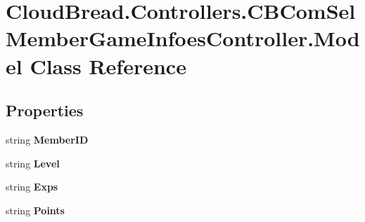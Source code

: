 \hypertarget{class_cloud_bread_1_1_controllers_1_1_c_b_com_sel_member_game_infoes_controller_1_1_model}{}\section{Cloud\+Bread.\+Controllers.\+C\+B\+Com\+Sel\+Member\+Game\+Infoes\+Controller.\+Model Class Reference}
\label{class_cloud_bread_1_1_controllers_1_1_c_b_com_sel_member_game_infoes_controller_1_1_model}
\subsection*{Properties}
\begin{DoxyCompactItemize}
\item 
string {\bfseries Member\+ID}\hypertarget{class_cloud_bread_1_1_controllers_1_1_c_b_com_sel_member_game_infoes_controller_1_1_model_a66c63361d1da0096d01a96eb7acb1383}{}\label{class_cloud_bread_1_1_controllers_1_1_c_b_com_sel_member_game_infoes_controller_1_1_model_a66c63361d1da0096d01a96eb7acb1383}

\item 
string {\bfseries Level}\hypertarget{class_cloud_bread_1_1_controllers_1_1_c_b_com_sel_member_game_infoes_controller_1_1_model_adaefeaf71c374b484f6d892f1ecba18a}{}\label{class_cloud_bread_1_1_controllers_1_1_c_b_com_sel_member_game_infoes_controller_1_1_model_adaefeaf71c374b484f6d892f1ecba18a}

\item 
string {\bfseries Exps}\hypertarget{class_cloud_bread_1_1_controllers_1_1_c_b_com_sel_member_game_infoes_controller_1_1_model_a63fce7468b898a385ba3d91a989aa09d}{}\label{class_cloud_bread_1_1_controllers_1_1_c_b_com_sel_member_game_infoes_controller_1_1_model_a63fce7468b898a385ba3d91a989aa09d}

\item 
string {\bfseries Points}\hypertarget{class_cloud_bread_1_1_controllers_1_1_c_b_com_sel_member_game_infoes_controller_1_1_model_ac5f3995cc6c09ecdffe5602fec895cea}{}\label{class_cloud_bread_1_1_controllers_1_1_c_b_com_sel_member_game_infoes_controller_1_1_model_ac5f3995cc6c09ecdffe5602fec895cea}


\end{DoxyCompactItemize}
